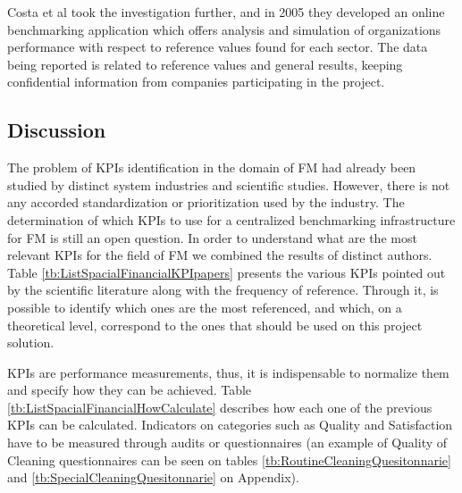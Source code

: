 Costa et al \cite{Costa2005} took the investigation further, and in 2005 they developed an online benchmarking application which offers analysis and simulation of organizations performance with respect to reference values found for each sector. 
The data being reported is related to reference values and general results, keeping confidential information from companies participating in the project.

 




\subsection{Discussion}

The problem of KPIs identification in the domain of FM had already been studied by distinct system industries and scientific studies. However, there is not any accorded standardization or prioritization used by the industry. The determination of which KPIs to use for a centralized benchmarking infrastructure for FM is still an open question.  
In order to understand what are the most relevant KPIs for the field of FM we combined the results of distinct authors.
Table \ref{tb:ListSpacialFinancialKPIpapers} presents the various KPIs pointed out by the scientific literature along with the frequency of reference. Through it, is possible to identify which ones are the most referenced, and which, on a theoretical level, correspond to the ones that should be used on this project solution. 

KPIs are performance measurements, thus, it is indispensable to normalize them and specify how they can be achieved.
Table \ref{tb:ListSpacialFinancialHowCalculate} describes how each one of the previous KPIs can be calculated. Indicators on categories such as Quality and Satisfaction have to be measured through audits or questionnaires (an example of Quality of Cleaning questionnaires can be seen on tables \ref{tb:RoutineCleaningQuesitonnarie} and \ref{tb:SpecialCleaningQuesitonnarie} on Appendix).

